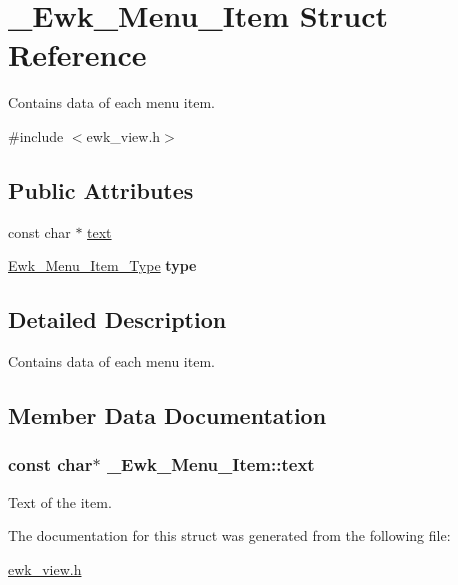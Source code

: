 \hypertarget{struct__Ewk__Menu__Item}{\section{\+\_\+\+Ewk\+\_\+\+Menu\+\_\+\+Item Struct Reference}
\label{struct__Ewk__Menu__Item}
}


Contains data of each menu item.  




{\ttfamily \#include $<$ewk\+\_\+view.\+h$>$}

\subsection*{Public Attributes}
\begin{DoxyCompactItemize}
\item 
const char $\ast$ \hyperlink{struct__Ewk__Menu__Item_a88c719dd1cc61b8fa881be04849d43d9}{text}
\item 
\hypertarget{struct__Ewk__Menu__Item_a20902ca08df402ec8f510121dfe994b4}{\hyperlink{ewk__view_8h_afb085505ceb67b99c9f89b6c218e5d7c}{Ewk\+\_\+\+Menu\+\_\+\+Item\+\_\+\+Type} {\bfseries type}}\label{struct__Ewk__Menu__Item_a20902ca08df402ec8f510121dfe994b4}

\end{DoxyCompactItemize}


\subsection{Detailed Description}
Contains data of each menu item. 

\subsection{Member Data Documentation}
\hypertarget{struct__Ewk__Menu__Item_a88c719dd1cc61b8fa881be04849d43d9}{
\subsubsection[{text}]{\setlength{\rightskip}{0pt plus 5cm}const char$\ast$ \+\_\+\+Ewk\+\_\+\+Menu\+\_\+\+Item\+::text}}\label{struct__Ewk__Menu__Item_a88c719dd1cc61b8fa881be04849d43d9}
Text of the item. 

The documentation for this struct was generated from the following file\+:\begin{DoxyCompactItemize}
\item 
\hyperlink{ewk__view_8h}{ewk\+\_\+view.\+h}\end{DoxyCompactItemize}
